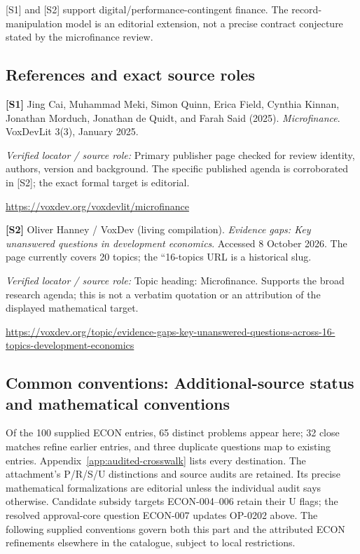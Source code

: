 \documentclass[11pt,a4paper]{article}
\begin{document}
[S1] and [S2] support digital/performance-contingent finance. The record-manipulation model is an editorial extension, not a precise contract conjecture stated by the microfinance review.

\subsection*{References and exact source roles}

{\footnotesize\raggedright
\par\noindent\textbf{[S1]} Jing Cai, Muhammad Meki, Simon Quinn, Erica Field, Cynthia Kinnan, Jonathan Morduch, Jonathan de Quidt, and Farah Said (2025). \emph{Microfinance}. VoxDevLit 3(3), January 2025.\par \textit{Verified locator / source role:} Primary publisher page checked for review identity, authors, version and background. The specific published agenda is corroborated in [S2]; the exact formal target is editorial.\par \url{https://voxdev.org/voxdevlit/microfinance}\par\smallskip
\par\noindent\textbf{[S2]} Oliver Hanney / VoxDev (living compilation). \emph{Evidence gaps: Key unanswered questions in development economics}. Accessed 8 October 2026. The page currently covers 20 topics; the ``16-topics URL is a historical slug.\par \textit{Verified locator / source role:} Topic heading: Microfinance. Supports the broad research agenda; this is not a verbatim quotation or an attribution of the displayed mathematical target.\par \url{https://voxdev.org/topic/evidence-gaps-key-unanswered-questions-across-16-topics-development-economics}\par\smallskip
}

\subsection*{Common conventions: Additional-source status and mathematical conventions}

\label{audited:conventions}

Of the 100 supplied ECON entries, 65 distinct problems appear here; 32 close
matches refine earlier entries, and three duplicate questions map to existing
entries. Appendix~\ref{app:audited-crosswalk} lists every destination.
The attachment's P/R/S/U distinctions and source audits are retained. Its
precise mathematical formalizations are editorial unless the individual audit
says otherwise. Candidate subsidy targets ECON-004--006 retain their U flags;
the resolved approval-core question ECON-007 updates OP-0202 above.
The following supplied conventions govern both this part and the attributed
ECON refinements elsewhere in the catalogue, subject to local restrictions.
\end{document}
